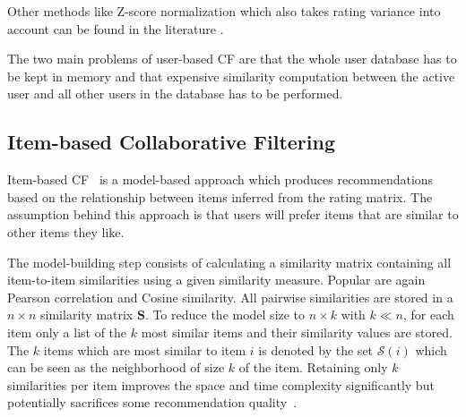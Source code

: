 \documentclass[nojss]{jss}
\newcommand{\set}[1]{\mathcal{#1}}
\newcommand{\mat}[1]{{\mathbf{#1}}}
\begin{document}
Other methods like Z-score normalization which also takes rating variance 
into account can be found in the 
literature \citep[see, e.g.,][]{recommender:Desrosiers:2011}. 


The two main problems of user-based CF are that the whole
user database has to be kept in memory and that 
expensive similarity computation between the active user and
all other users in the database has to be performed.


\subsection{Item-based Collaborative Filtering}
Item-based CF~\citep{Kitts:2000,recommender:Sarwar:2001,
recommender:Linden:2003,recommender:Deshpande:2004}
is a model-based approach which produces recommendations
based on the relationship between items inferred from the rating
matrix. The assumption behind this approach is that users will prefer items 
that are similar to other items they like.

The model-building step consists of calculating a similarity matrix
containing all item-to-item similarities using a given similarity measure.
Popular are again Pearson correlation and Cosine similarity. 
%
All pairwise similarities are stored in a $n \times n$ 
similarity matrix $\mat{S}$.
To reduce the model size
to $n \times k$ with $k \ll n$, 
for each item only a list of the $k$ most similar
items and their similarity values are stored.
The $k$ items which are most similar to item $i$ is
denoted by the set $\set{S}(i)$ which can be seen as the 
neighborhood of size $k$ of the item.
Retaining only $k$ similarities per item improves the
space and time complexity significantly but potentially sacrifices
some recommendation quality~\citep{recommender:Sarwar:2001}.
\end{document}
